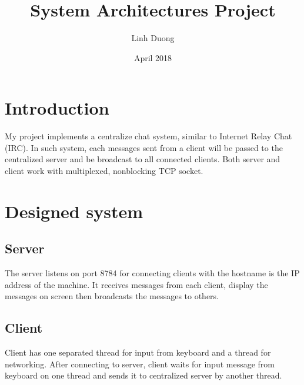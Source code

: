 \documentclass{article}
\title{System Architectures Project}
\author{Linh Duong}
\date{April 2018}
\begin{document}
\maketitle

\bigskip
\section{Introduction}
My project implements a centralize chat system, similar to Internet Relay Chat (IRC). In such system, each messages sent from a client will be passed to the centralized server and be broadcast to all connected clients. Both server and client work with multiplexed, nonblocking TCP socket. 

\section{Designed system}
\subsection{Server}
The server listens on port 8784 for connecting clients with the hostname is the IP address of the machine. It receives messages from each client, display the messages on screen then broadcasts the messages to others. 

\subsection{Client}
Client has one separated thread for input from keyboard and a thread for networking. After connecting to server, client waits for input message from keyboard on one thread and sends it to centralized server by another thread. 
\end{document}

